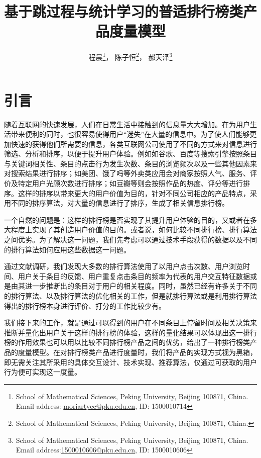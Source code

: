 \documentclass[UTF8]{ctexart}
\theoremstyle{plain}
\theoremstyle{definition}
\theoremstyle{remark}
\begin{document}
	\setcounter{footnote}{1}
	\title{基于跳过程与统计学习的普适排行榜类产品度量模型}
	\author{程晨\footnote{School of Mathematical Sciences, Peking University, Beijing 100871, China. Email address:
			\href{mailto:moriartycc@pku.edu.cn}{moriartycc@pku.edu.cn}, ID: 1500010714}， \quad 陈子恒\footnote{School of Mathematical Sciences, Peking University, Beijing 100871, China. }， \quad 郝天泽\footnote{School of Mathematical Sciences, Peking University, Beijing 100871, China. Email address:\href{mailto:1500010606@pku.edu.cn}{1500010606@pku.edu.cn}, ID: 1500010606}}
	\date{}
	\maketitle
	\newpage
	\tableofcontents
	\newpage
	\section{引言}
    随着互联网的快速发展，人们在日常生活中接触到的信息量大大增加。在为用户生活带来便利的同时，也很容易使得用户“迷失”在大量的信息中。为了使人们能够更加快速的获得他们所需要的信息，各类互联网公司使用了不同的方式来对信息进行筛选、分析和排序，以便于提升用户体验。例如如谷歌、百度等搜索引擎按照条目与关键词相关性、条目的点击行为发生次数、条目的浏览频次以及一些其他因素来对搜索结果进行排序；如美团、饿了吗等外卖类应用会对商家按照人气、服务、评价及特定用户光顾次数进行排序；如豆瓣等则会按照作品的热度、评分等进行排序。这样的排序以带来更大的用户价值为目的，针对不同公司相应的产品特点，采用不同的排序算法，对大量的信息进行了排序，生成了相关信息排行榜。

    一个自然的问题是：这样的排行榜是否实现了其提升用户体验的目的，又或者在多大程度上实现了其创造用户价值的目的。或者说，如何比较不同排行榜、排行算法之间优劣。为了解决这一问题，我们先考虑可以通过技术手段获得的数据以及不同的排行算法如何应用这些数据这一问题。

    通过文献调研，我们发现大多数的排行算法使用了以用户点击次数、用户浏览时间、用户关于条目的反馈、用户重复点击条目的频率为代表的用户交互特征数据或是由其进一步推断出的条目对于用户的相关程度。同时，虽然已经有许多关于不同的排行算法、以及排行算法的优化相关的工作，但是就排行算法或是利用排行算法得出的排行榜本身进行评价、打分的工作比较少有。

    我们接下来的工作，就是通过可以得到的用户在不同条目上停留时间及相关决策来推断并量化出用户关于这样的排行榜的体验，这样的量化结果可以体现出这一排行榜的作用效果也可以用以比较不同排行榜产品之间的优劣，给出了一种排行榜类产品的度量模型。在对排行榜类产品进行度量时，我们将产品的实现方式视为黑箱，即无需关注其所采用的具体交互设计、技术实现、推荐算法，仅通过可获取的用户行为便可实现这一度量。
\end{document}
